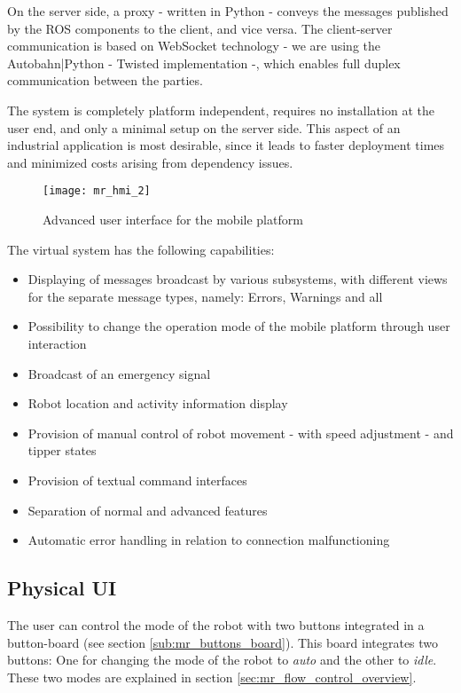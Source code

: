 	On the server side, a proxy - written in Python\cite{python} - conveys the messages published by the ROS\cite{ros} components to the client, and vice versa. The client-server communication is based on WebSocket\cite{ws} technology - we are using the Autobahn|Python\cite{autobahn} - Twisted\cite{twisted} implementation -, which enables full duplex communication between the parties.
	
	The system is completely platform independent, requires no installation at the user end, and only a minimal setup on the server side. This aspect of an industrial application is most desirable, since it leads to faster deployment times and minimized costs arising from dependency issues.
	
	\begin{figure}[H]
		\centering
		\texttt{[image: mr\_hmi\_2]}
		\caption{Advanced user interface for the mobile platform}
		\label{fig:mr_hmi_2}
	\end{figure}
	
	The virtual system has the following capabilities:
	
	\begin{itemize}
		\item Displaying of messages broadcast by various subsystems, with different views for the separate message types, namely: Errors, Warnings and all
		\item Possibility to change the operation mode of the mobile platform through user interaction
		\item Broadcast of an emergency signal
		\item Robot location and activity information display
		\item Provision of manual control of robot movement - with speed adjustment - and tipper states
		\item Provision of textual command interfaces
		\item Separation of normal and advanced features
		\item Automatic error handling in relation to connection malfunctioning 
	\end{itemize}


	\subsection{Physical UI} %
	\label{sub:mr_physical_devices}
	The user can control the mode of the robot with two buttons integrated in a button-board (see section \ref{sub:mr_buttons_board}).
	This board integrates two buttons: One for changing the mode of the robot to \emph{auto} and the other to \emph{idle}. These two modes are explained in section \ref{sec:mr_flow_control_overview}.

